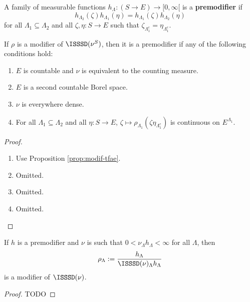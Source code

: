 \begin{definition}
    \label{def:premodif}
    \leanok

    A family of measurable functions $h_\Lambda : (S \to E) \to [0, \infty[$ is a {\bf premodifier} if
    $$h_{\Lambda_2}(\zeta)h_{\Lambda_1}(\eta) = h_{\Lambda_1}(\zeta)h_{\Lambda_2}(\eta)$$
    for all $\Lambda_1 \subseteq \Lambda_2$ and all $\zeta, \eta : S \to E$ such that $\zeta_{\Lambda_1^c} = \eta_{\Lambda_1^c}$.
\end{definition}

\begin{lemma}
    \label{lem:modif-premodif}
    If $\rho$ is a modifier of $\ISSSD(\nu^S)$, then it is a premodifier if any of the following conditions hold:
    \begin{enumerate}
        \item $E$ is countable and $\nu$ is equivalent to the counting measure.
        \item $E$ is a second countable Borel space.
        \item $\nu$ is everywhere dense.
        \item For all $\Lambda_1 \subseteq \Lambda_2$ and all $\eta : S \to E$, $\zeta \mapsto \rho_{\Lambda_1}(\zeta \eta_{\Lambda_1^c})$ is continuous on $E^{\Lambda_1}$.
    \end{enumerate}
\end{lemma}
\begin{proof}

    \begin{enumerate}
        \item Use Proposition \ref{prop:modif-tfae}.
        \item Omitted.
        \item Omitted.
        \item Omitted.
    \end{enumerate}
\end{proof}

\begin{lemma}
    \label{lem:premodif-modif}
    \leanok
    If $h$ is a premodifier and $\nu$ is such that $0 < \nu_\Lambda h_\Lambda < \infty$ for all $\Lambda$, then
    $$\rho_\Lambda := \frac{h_\Lambda}{\ISSSD(\nu)_\Lambda h_\Lambda}$$
    is a modifier of $\ISSSD(\nu)$.
\end{lemma}
\begin{proof}

    TODO
\end{proof}

